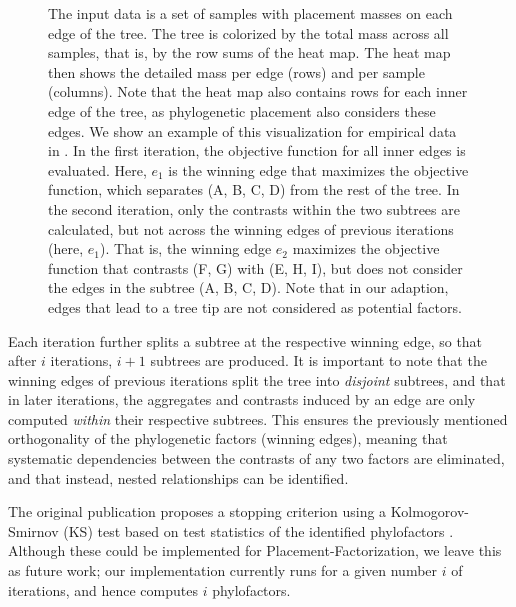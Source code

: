 \begin{figure}[!htbp]
{        
        The input data is a set of samples with placement masses on each edge of the tree.
        The tree is colorized by the total mass across all samples, that is, by the row sums of the heat map.
        The heat map then shows the detailed mass per edge (rows) and per sample (columns).
        Note that the heat map also contains rows for each inner edge of the tree,
        as phylogenetic placement also considers these edges.
        We show an example of this visualization for empirical data in .
         In the first iteration,
        the objective function for all inner edges is evaluated.
        Here, $e_1$ is the winning edge that maximizes the objective function,
        which separates ({\sffamily A}, {\sffamily B}, {\sffamily C}, {\sffamily D}) from the rest of the tree.
         In the second iteration,
        only the contrasts within the two subtrees %
        are calculated,
        but not across the winning edges of previous iterations (here, $e_1$).
        That is, the winning edge $e_2$ maximizes the objective function that contrasts ({\sffamily F}, {\sffamily G})
        with ({\sffamily E}, {\sffamily H}, {\sffamily I}),
        but does not consider the edges in the subtree ({\sffamily A}, {\sffamily B}, {\sffamily C}, {\sffamily D}).
        Note that in our adaption, edges that lead to a tree tip are not considered as potential factors.
    }
    \label{fig:phylofactor}
\end{figure}

Each iteration further splits a subtree at the respective winning edge,
so that after $i$ iterations, $i+1$ subtrees are produced.
It is important to note that the winning edges of previous iterations split the tree into \emph{disjoint} subtrees,
and that in later iterations,
the aggregates and contrasts induced by an edge are only computed \emph{within} their respective subtrees.
This ensures the previously mentioned orthogonality of the phylogenetic factors (winning edges),
meaning that systematic dependencies between the contrasts of any two factors are eliminated,
and that instead, nested relationships can be identified.

The original publication proposes a stopping criterion using a Kolmogorov-Smirnov (KS) test based on %
test statistics of the identified phylofactors \cite{Washburne2017a,Washburne2019}.
Although these could be implemented for Placement-Factorization, we leave this as future work;
our implementation currently runs for a given number $i$ of iterations, and hence computes $i$ phylofactors.

